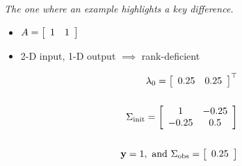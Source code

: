 \begin{frame}[t]{\it The one where an example highlights a key difference.}

\begin{itemize}
\item $A=\mat{cc}{1 & 1}$
\item 2-D input, 1-D output $\implies$ rank-deficient
\end{itemize}
\bigskip

\begin{equation*}
\begin{split}
	\initialMean = \mat{cc}{0.25 & 0.25}^\top \\ \\
  \initialCov = \mat{cc}{1 & -0.25 \\ -0.25 & 0.5} \\ \\
  \observedMean=1, \text{ and } \observedCov = \mat{c}{0.25}
\end{split}
\end{equation*}

\end{frame}


